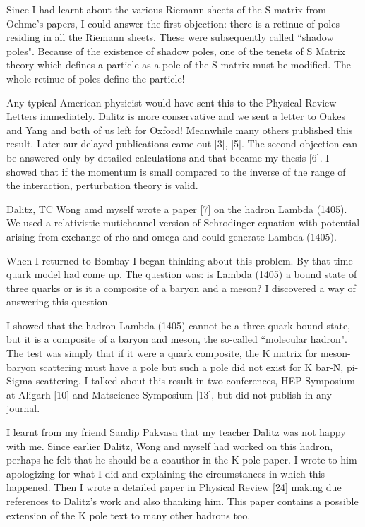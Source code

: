 \vskip 1pt
Since I had learnt about the various Riemann sheets of the S matrix from 
Oehme's papers, I could answer the first objection: there is a retinue 
of poles residing in all the Riemann sheets. These were subsequently 
called ``shadow poles". Because of the existence of shadow poles, one of 
the tenets of S Matrix theory which defines a particle as a pole of the 
S matrix must be modified. The whole retinue of poles define the 
particle!

Any typical American physicist would have sent this to the Physical 
Review Letters immediately. Dalitz is more conservative and we sent a 
letter to Oakes and Yang and both of us left for Oxford! Meanwhile many 
others published this result. Later our delayed publications came out 
[3], [5]. The second objection can be answered only by detailed 
calculations and that became my thesis [6]. I showed that if the momentum 
is small compared to the inverse of the range of the interaction, 
perturbation theory is valid.

Dalitz, TC Wong amd myself wrote a paper [7] on the hadron Lambda 
(1405). We used a relativistic mutichannel version of Schrodinger 
equation with potential arising from exchange of rho and omega and could 
generate Lambda (1405).

When I returned to Bombay I began thinking about this pro\-blem. By that 
time quark model had come up. The question was: is Lambda (1405) a bound 
state of three quarks or is it a compo\-site of a baryon and a meson? I 
discovered a way of answering this question.

I showed that the hadron Lambda (1405) cannot be a three-quark bound 
state, but it is a composite of a baryon and meson, the so-called 
``molecular hadron". The test was simply that if it were a quark 
composite, the K matrix for meson-baryon scatte\-ring must have a pole but 
such a pole did not exist for K bar-N, pi-Sigma scattering. I talked 
about this result in two conferences, HEP Symposium at Aligarh [10] and 
Matscience Symposium [13], but did not publish in any journal.

I learnt from my friend Sandip Pakvasa that my teacher Dalitz was not 
happy with me. Since earlier Dalitz, Wong and myself had worked on this 
hadron, perhaps he felt that he should be a coauthor in the K-pole 
paper. I wrote to him apologizing for what I did and explaining the 
circumstances in which this happe\-ned. Then I wrote a detailed paper in 
Physical Review [24] ma\-king due references to Dalitz's work and also 
thanking him. This paper contains a possible extension of the K pole 
text to many other hadrons too.

